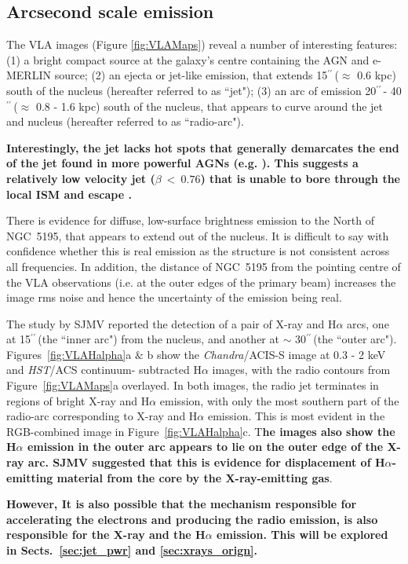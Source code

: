 \documentclass[fleqn,usenatbib]{mnras}
\def\fig{Figure}
\def\Fig{Figure}
\def\Figs{Figures}
\def\sects{Sects.}
\def\arcs{$^{\prime\prime}\,$}
\begin{document}
\subsection{Arcsecond scale emission }

The VLA images (Figure \ref{fig:VLAMaps}) reveal a number of interesting features: (1) a bright compact source at the galaxy's centre containing the AGN and e-MERLIN source; (2) an ejecta or jet-like emission, that extends 15\arcs ($\approx$ 0.6 kpc) south of the nucleus (hereafter referred to as ``jet"); (3) an arc of emission 20\arcs - 40\arcs ($\approx$ 0.8 - 1.6 kpc) south of the nucleus, that appears to curve around the jet and nucleus (hereafter referred to as ``radio-arc"). 

\textbf{Interestingly, the jet lacks hot spots that generally demarcates the end of the jet found in more powerful AGNs (e.g. \citealt{PT2000,Girolettietal2003}). This suggests a relatively low velocity jet ($\beta~<~0.76$) that is unable to bore through the local ISM and escape \citep{GGT2004}.
}

There is evidence for diffuse, low-surface brightness emission to the North of NGC~5195, that appears 
to extend out of the nucleus. It is difficult to say with confidence whether this is real emission as 
the structure is not consistent across all frequencies. In addition, the distance of NGC~5195 from the pointing centre of the VLA observations (i.e. at the outer edges of the primary beam) increases the image rms noise and hence the uncertainty of the emission being real.

The study by SJMV reported the detection of a pair of X-ray and H$\alpha$ arcs, one at 15\arcs (the ``inner arc") from the nucleus, and  another at $\sim$ 30\arcs (the ``outer arc"). \Figs~\ref{fig:VLAHalpha}a $\&$ b show the \textit{Chandra}/ACIS-S image at 0.3 - 2 keV and \textit{HST}/ACS continuum-
subtracted H$\alpha$ images, with the radio contours from \fig~\ref{fig:VLAMaps}a overlayed.
In both images, the radio jet terminates in regions of bright X-ray and H$\alpha$ emission, with only the 
most southern part of the radio-arc corresponding to X-ray and H$\alpha$ emission. This is most evident in 
the RGB-combined image in \Fig~\ref{fig:VLAHalpha}c. T\textbf{he images also show the H$\alpha$ emission in the outer arc appears to lie on the outer edge of the X-ray arc. SJMV suggested that this is evidence for displacement of H$\alpha$-emitting material from the core by the X-ray-emitting gas}. 

\textbf{However, It is also possible that the mechanism responsible for accelerating the electrons and producing the 
radio emission, is also responsible for the X-ray and the H$\alpha$ emission. This will be explored in \sects~\ref{sec:jet_pwr} and \ref{sec:xrays_orign}.}
\end{document}
